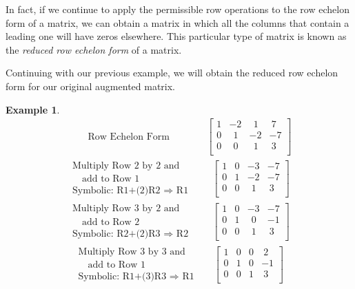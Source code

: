 \documentclass[12pt]{book}
\theoremstyle{definition}
\newtheorem{example}{Example}
\begin{document}
In fact, if we continue to apply the permissible row operations to the row echelon form of a matrix, we can obtain a matrix in which all the columns that contain a leading one will have zeros elsewhere.  This particular type of matrix is known as the {\it reduced row echelon form} of a matrix.\par
Continuing with our previous example, we will obtain the reduced row echelon form for our original augmented matrix.
\begin{example}
\begin{eqnarray*}
~~~~~~~~~~\text{Row Echelon Form}
&&
~~~~~~~~~~\left[
\begin{array}{ccc|c}
1 & -2 & ~~1 & ~7\\
0 & ~~1 & -2 & -7\\
0 & ~~0 & ~~1 & ~3\\
\end{array}
\right]
\end{eqnarray*}
\begin{eqnarray*}
\begin{array}{l}
\text{Multiply Row 2 by 2 and}\\
\text{~~~add to Row 1}\\
\text{Symbolic: R1+(2)R2~}\Rightarrow \text{~R1}
\end{array}
&&
~~\left[
\begin{array}{ccc|c}
1 & 0 & -3 & -7\\
0 & 1 & -2 & -7\\
0 & 0 & ~~1 & ~3\\
\end{array}
\right]
\end{eqnarray*}
\begin{eqnarray*}
\begin{array}{l}
\text{Multiply Row 3 by 2 and}\\
\text{~~~add to Row 2}\\
\text{Symbolic: R2+(2)R3~}\Rightarrow \text{~R2}
\end{array}
&&
~~\left[
\begin{array}{ccc|c}
1 & 0 & -3 & -7\\
0 & 1 & ~~0 & -1\\
0 & 0 & ~~1 & ~3\\
\end{array}
\right]
\end{eqnarray*}
\begin{eqnarray*}
\begin{array}{l}
\text{Multiply Row 3 by 3 and}\\
\text{~~~add to Row 1}\\
\text{Symbolic: R1+(3)R3~}\Rightarrow \text{~R1}
\end{array}
&&
\left[
\begin{array}{ccc|c}
1 & 0 & 0 & ~2\\
0 & 1 & 0 & -1\\
0 & 0 & 1 & ~3\\
\end{array}
\right]
\end{eqnarray*}
\end{example}
\end{document}
